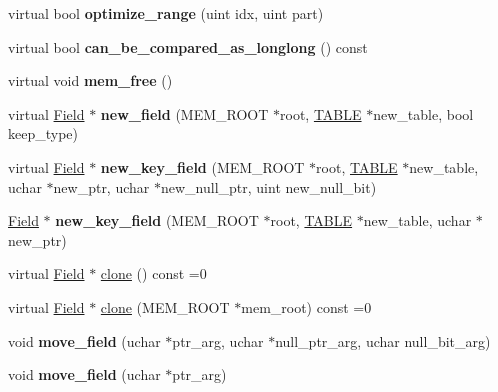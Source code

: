 \begin{DoxyCompactItemize}
virtual bool {\bfseries optimize\+\_\+range} (uint idx, uint part)
\item 
\mbox{\label{classField_a7f9b7d30252a54f4536bdac1ee78fefc}} 
virtual bool {\bfseries can\+\_\+be\+\_\+compared\+\_\+as\+\_\+longlong} () const
\item 
\mbox{\label{classField_aea5ea9b75f8650749519645b95e5dd1e}} 
virtual void {\bfseries mem\+\_\+free} ()
\item 
\mbox{\label{classField_a3e036e1dbc80b22f258f535f41d2262f}} 
virtual \mbox{\hyperlink{classField}{Field}} $\ast$ {\bfseries new\+\_\+field} (M\+E\+M\+\_\+\+R\+O\+OT $\ast$root, \mbox{\hyperlink{structTABLE}{T\+A\+B\+LE}} $\ast$new\+\_\+table, bool keep\+\_\+type)
\item 
\mbox{\label{classField_ac61c8ff8ff6b190f1ad07057f015d5c5}} 
virtual \mbox{\hyperlink{classField}{Field}} $\ast$ {\bfseries new\+\_\+key\+\_\+field} (M\+E\+M\+\_\+\+R\+O\+OT $\ast$root, \mbox{\hyperlink{structTABLE}{T\+A\+B\+LE}} $\ast$new\+\_\+table, uchar $\ast$new\+\_\+ptr, uchar $\ast$new\+\_\+null\+\_\+ptr, uint new\+\_\+null\+\_\+bit)
\item 
\mbox{\label{classField_aaac8d53701a07bc97faab1cf01a75529}} 
\mbox{\hyperlink{classField}{Field}} $\ast$ {\bfseries new\+\_\+key\+\_\+field} (M\+E\+M\+\_\+\+R\+O\+OT $\ast$root, \mbox{\hyperlink{structTABLE}{T\+A\+B\+LE}} $\ast$new\+\_\+table, uchar $\ast$new\+\_\+ptr)
\item 
virtual \mbox{\hyperlink{classField}{Field}} $\ast$ \mbox{\hyperlink{classField_a01a9a9aa3a618941e839b1b8793c969d}{clone}} () const =0
\item 
virtual \mbox{\hyperlink{classField}{Field}} $\ast$ \mbox{\hyperlink{classField_a64979bcb9345803b031fff76a0c3d9fe}{clone}} (M\+E\+M\+\_\+\+R\+O\+OT $\ast$mem\+\_\+root) const =0
\item 
\mbox{\label{classField_a65b03a01193a139cc6da52d55c55d283}} 
void {\bfseries move\+\_\+field} (uchar $\ast$ptr\+\_\+arg, uchar $\ast$null\+\_\+ptr\+\_\+arg, uchar null\+\_\+bit\+\_\+arg)
\item 
\mbox{\label{classField_a36b076128a5931a136143e21df3e7bc5}} 
void {\bfseries move\+\_\+field} (uchar $\ast$ptr\+\_\+arg)

\end{DoxyCompactItemize}
